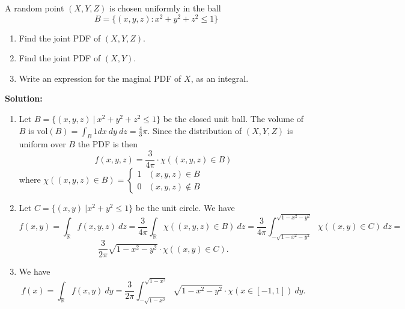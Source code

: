\documentclass{harvardml}
\theoremstyle{definition}
\theoremstyle{plain}
\begin{document}
\begin{problem}

A random point $(X, Y, Z)$ is chosen uniformly in the ball 
$$B = \{(x, y, z): x^2 + y^2 + z^2 \leq 1\}$$

\begin{enumerate} [label=(\alph*)] 
\item Find the joint PDF of $(X, Y, Z)$.
\item Find the joint PDF of $(X, Y)$.
\item Write an expression for the maginal PDF of $X$, as an integral.

\end{enumerate}

\noindent\textbf{Solution:}
\begin{enumerate}[label=(\alph*)]
    \item Let $B = \{(x, y, z) \ | \ x^2 + y^2 + z^2 \leq 1\}$ be the closed unit ball. The volume of $B$ is $\text{vol}(B) = \int_B 1 dx \ dy \ dz = \frac{4}{3}\pi$. Since the distribution of $(X, Y, Z)$ is uniform over $B$ the PDF is then $$f(x, y, z) = \frac{3}{4\pi}\cdot\chi((x, y, z) \in B)$$
    where $\chi((x, y, z) \in B) = \begin{cases}
    1 & (x, y, z) \in B \\
    0 & (x, y, z) \not\in B
    \end{cases}$
    \item Let $C = \{(x, y) \ | x^2 + y^2 \leq 1\}$ be the unit circle. We have
    $$
    f(x, y) = \int_{\mathbb R} f(x, y, z) \ dz = \frac{3}{4\pi} \int_{\mathbb R}\chi((x, y, z) \in B) \ dz = \frac{3}{4\pi} \int_{-\sqrt{1-x^2-y^2}}^{\sqrt{1-x^2-y^2}} \chi((x, y) \in C) \ dz = $$ $$\frac{3}{2\pi} \sqrt{1-x^2-y^2} \cdot \chi((x, y) \in C)
    .$$
    \item We have
    $$
    f(x) = \int_{\mathbb R} f(x, y) \ dy = \frac{3}{2\pi}\int_{-\sqrt{1-x^2}}^{\sqrt{1-x^2}} \sqrt{1-x^2-y^2} \cdot \chi(x \in [-1, 1]) \ dy
    .$$
\end{enumerate}
\end{problem}
\end{document}
